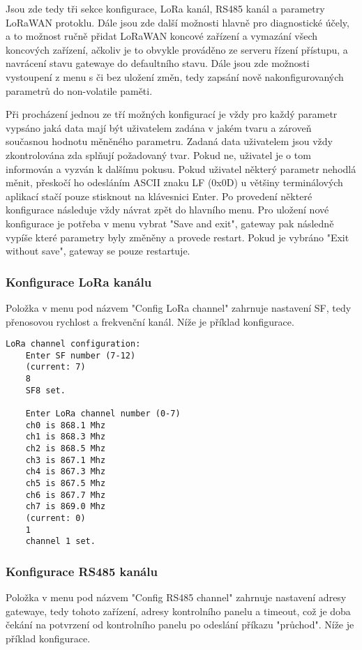 Jsou zde tedy tři sekce konfigurace, LoRa kanál, RS485 kanál a parametry LoRaWAN protoklu.
Dále jsou zde další možnosti hlavně pro diagnostické účely, a to možnost ručně přidat LoRaWAN koncové zařízení a vymazání všech koncových zařízení, ačkoliv je to obvykle prováděno ze serveru řízení přístupu, a navrácení stavu gatewaye do defaultního stavu. Dále jsou zde možnosti vystoupení z menu s či bez uložení změn, tedy zapsání nově nakonfigurovaných parametrů do non-volatile paměti.

Při procházení jednou ze tří možných konfigurací je vždy pro každý parametr vypsáno jaká data mají být uživatelem zadána v jakém tvaru a zároveň současnou hodnotu měněného parametru. Zadaná data uživatelem jsou vždy zkontrolována zda splňují požadovaný tvar. Pokud ne, uživatel je o tom informován a vyzván k dalšímu pokusu.
Pokud uživatel některý parametr nehodlá měnit, přeskočí ho odesláním ASCII znaku LF (0x0D) u většiny terminálových aplikací stačí pouze stisknout na klávesnici Enter.
Po provedení některé konfigurace následuje vždy návrat zpět do hlavního menu. Pro uložení nové konfigurace je potřeba v menu vybrat "Save and exit", gateway pak následně vypíše které parametry byly změněny a provede restart. Pokud je vybráno "Exit without save", gateway se pouze restartuje.


\subsubsection{Konfigurace LoRa kanálu}
Položka v menu pod názvem "Config LoRa channel" zahrnuje nastavení SF, tedy přenosovou rychlost a frekvenční kanál. Níže je příklad konfigurace.

\begin{lstlisting}[style=log]
    LoRa channel configuration:
    Enter SF number (7-12)
    (current: 7)
    8
    SF8 set.

    Enter LoRa channel number (0-7)
    ch0 is 868.1 Mhz
    ch1 is 868.3 Mhz
    ch2 is 868.5 Mhz
    ch3 is 867.1 Mhz
    ch4 is 867.3 Mhz
    ch5 is 867.5 Mhz
    ch6 is 867.7 Mhz
    ch7 is 869.0 Mhz
    (current: 0)
    1
    channel 1 set.
\end{lstlisting}

\subsubsection{Konfigurace RS485 kanálu}
Položka v menu pod názvem "Config RS485 channel" zahrnuje nastavení adresy gatewaye, tedy tohoto zařízení, adresy kontrolního panelu a timeout, což je doba čekání na potvrzení od kontrolního panelu po odeslání příkazu "průchod". Níže je příklad konfigurace.

